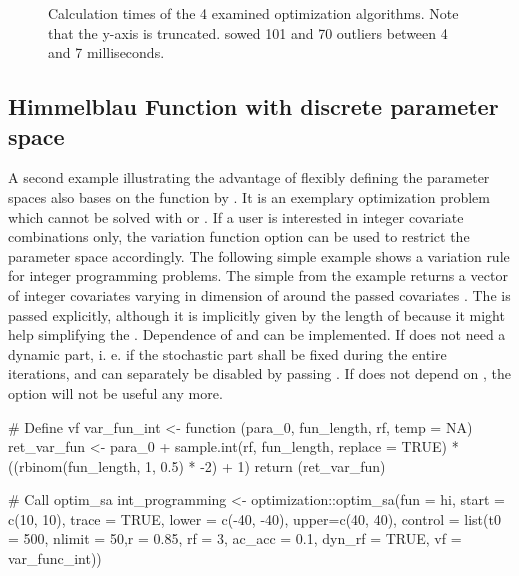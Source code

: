 \begin{figure}[htbp]
	\centering
	\resizebox{.6\linewidth}{!}{}
	\caption{Calculation times of the 4 examined optimization algorithms. Note that the y-axis is truncated.  sowed 101 and  70 outliers between 4 and 7 milliseconds.}
	\label{fig:fig1}
\end{figure}

\subsection{Himmelblau Function with discrete parameter space}
A second example illustrating the advantage of flexibly defining the parameter spaces also bases on the function by \citet{himmelblau_1972}. It is an exemplary optimization problem which cannot be solved with  or . If a user is interested in integer covariate combinations only, the variation function   option can be used to restrict the parameter space accordingly. The following simple example shows a variation rule for integer programming problems. The simple  from the example returns a vector of integer covariates varying in dimension of  around the passed covariates . The  is passed explicitly, although it is implicitly given by the length of  because it might help simplifying the . Dependence of  and  can be implemented. If  does not need a dynamic part, i. e. if the stochastic part shall be fixed during the entire iterations,  and  can separately be disabled by passing . If  does not depend on , the option  will not be useful any more.

\begin{example}
# Define vf
var_fun_int <- function (para_0, fun_length, rf, temp = NA) {
	ret_var_fun <- para_0 + sample.int(rf, fun_length, replace = TRUE) *
	((rbinom(fun_length, 1, 0.5) * -2) + 1)
	return (ret_var_fun)
}

# Call optim_sa
int_programming <- optimization::optim_sa(fun = hi, start = c(10, 10), trace = TRUE, 
	lower = c(-40, -40), upper=c(40, 40),
	control = list(t0 = 500, nlimit = 50,r = 0.85, rf = 3, ac_acc = 0.1,
		dyn_rf = TRUE, vf = var_func_int))
\end{example}


